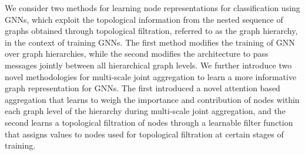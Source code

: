 

We consider two methods for learning node representations for classification using GNNs, which exploit the topological information from the nested sequence of graphs obtained through topological filtration, referred to as the graph hierarchy, in the context of training GNNs.  The first method modifies the training of GNN over graph hierarchies, while the second modifies the architecture to pass messages jointly between all hierarchical graph levels. We further introduce two novel methodologies for multi-scale joint aggregation to learn a more informative graph representation for GNNs. The first introduced a novel attention based aggregation that learns to weigh the importance and contribution of nodes within each graph level of the hierarchy during multi-scale joint aggregation, and the second learns a topological filtration of nodes through a learnable filter function that assigns values to nodes used for topological filtration at certain stages of training.%

